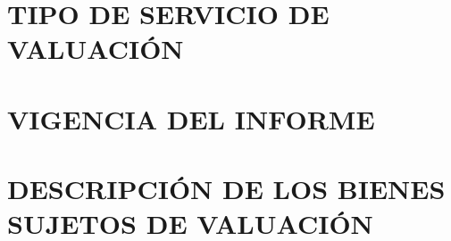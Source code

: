 \section{TIPO DE SERVICIO DE VALUACI\'ON}\label{sec:d}


\section{VIGENCIA DEL INFORME}\label{sec:e}



\section{DESCRIPCI\'ON DE LOS BIENES SUJETOS DE VALUACI\'ON}\label{sec:f}
